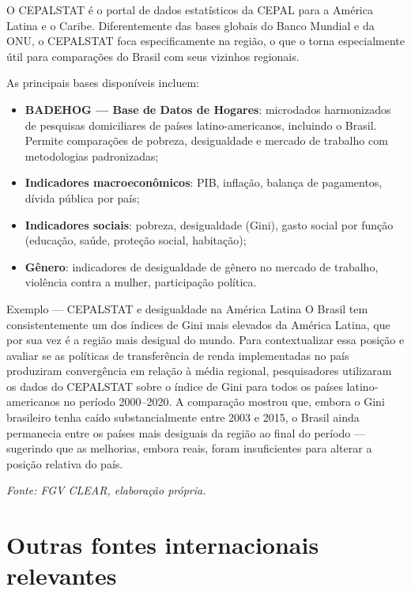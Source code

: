 O CEPALSTAT é o portal de dados estatísticos da CEPAL para a América Latina e o Caribe. Diferentemente das bases globais do Banco Mundial e da ONU, o CEPALSTAT foca especificamente na região, o que o torna especialmente útil para comparações do Brasil com seus vizinhos regionais.

As principais bases disponíveis incluem:

\begin{itemize}
  \item \textbf{BADEHOG --- Base de Datos de Hogares}: microdados harmonizados de pesquisas domiciliares de países latino-americanos, incluindo o Brasil. Permite comparações de pobreza, desigualdade e mercado de trabalho com metodologias padronizadas;
  \item \textbf{Indicadores macroeconômicos}: PIB, inflação, balança de pagamentos, dívida pública por país;
  \item \textbf{Indicadores sociais}: pobreza, desigualdade (Gini), gasto social por função (educação, saúde, proteção social, habitação);
  \item \textbf{Gênero}: indicadores de desigualdade de gênero no mercado de trabalho, violência contra a mulher, participação política.
\end{itemize}

\begin{boxexemplo}{Exemplo --- CEPALSTAT e desigualdade na América Latina}
O Brasil tem consistentemente um dos índices de Gini mais elevados da América Latina, que por sua vez é a região mais desigual do mundo. Para contextualizar essa posição e avaliar se as políticas de transferência de renda implementadas no país produziram convergência em relação à média regional, pesquisadores utilizaram os dados do CEPALSTAT sobre o índice de Gini para todos os países latino-americanos no período 2000--2020. A comparação mostrou que, embora o Gini brasileiro tenha caído substancialmente entre 2003 e 2015, o Brasil ainda permanecia entre os países mais desiguais da região ao final do período --- sugerindo que as melhorias, embora reais, foram insuficientes para alterar a posição relativa do país.

\textit{Fonte: FGV CLEAR, elaboração própria.}
\end{boxexemplo}

\section{Outras fontes internacionais relevantes}

